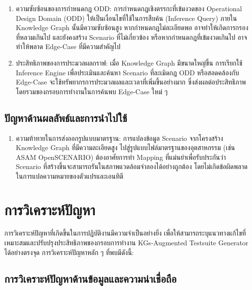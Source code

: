 \begin{enumerate}
    \item ความซับซ้อนของการกำหนดกฎ ODD: การกำหนดกฎเชิงตรรกะที่เข้มงวดของ Operational Design Domain (ODD) ให้เป็นเงื่อนไขที่ใช้ในการสืบค้น (Inference Query) ภายใน Knowledge Graph นั้นมีความซับซ้อนสูง หากกำหนดกฎไม่ละเอียดพอ อาจทำให้เกิดการกรองที่หลวมเกินไป และยังคงสร้าง Scenario ที่ไม่เกี่ยวข้อง หรือหากกำหนดกฎที่เข้มงวดเกินไป อาจทำให้พลาด Edge-Case ที่มีความสำคัญไป
    \item ประสิทธิภาพของการประมวลผลกราฟ: เมื่อ Knowledge Graph มีขนาดใหญ่ขึ้น การเรียกใช้ Inference Engine เพื่อประเมินและค้นหา Scenario ที่ละเมิดกฎ ODD หรือสอดคล้องกับ Edge-Case จะใช้ทรัพยากรการประมวลผลและเวลาที่เพิ่มขึ้นอย่างมาก ซึ่งส่งผลต่อประสิทธิภาพโดยรวมของกรอบการทำงานในการค้นพบ Edge-Case ใหม่ ๆ
\end{enumerate}

\subsection{ปัญหาด้านผลลัพธ์และการนำไปใช้}\label{subsec:output-usage}

\begin{enumerate}
    \item ความท้าทายในการส่งออกรูปแบบมาตรฐาน: การแปลงข้อมูล Scenario จากโครงสร้าง Knowledge Graph ที่มีความละเอียดสูง ไปสู่รูปแบบไฟล์มาตรฐานของอุตสาหกรรม (เช่น ASAM OpenSCENARIO) ต้องอาศัยการทำ Mapping ที่แม่นยำเพื่อรับประกันว่า Scenario ที่สร้างขึ้นจะสามารถรันในสภาพแวดล้อมจำลองได้อย่างถูกต้อง โดยไม่เกิดข้อผิดพลาดในการแปลความหมายของตัวแปรและเอนทิตี
\end{enumerate}

\section{การวิเคราะห์ปัญหา}\label{sec:problem-analysis}
\paragraph{}

การวิเคราะห์ปัญหาที่เกิดขึ้นในการปฏิบัติงานมีความจำเป็นอย่างยิ่ง เพื่อให้สามารถระบุแนวทางแก้ไขที่เหมาะสมและปรับปรุงประสิทธิภาพของกรอบการทำงาน KGs-Augmented Testsuite Generator ได้อย่างตรงจุด การวิเคราะห์ปัญหาหลัก ๆ ที่พบมีดังนี้:

\subsection{การวิเคราะห์ปัญหาด้านข้อมูลและความน่าเชื่อถือ}\label{subsec:data-reliability-analysis}

